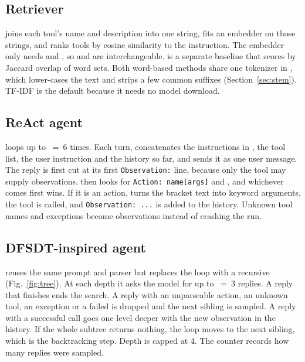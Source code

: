 \documentclass[conference,a4paper]{IEEEtran}
\begin{document}
\subsection{Retriever}
 joins each tool's name and description into one
string, fits an embedder on those strings, and ranks tools by cosine
similarity to the instruction. The embedder only needs  and
, so  and
 are interchangeable.
 is a separate baseline that scores by Jaccard
overlap of word sets. Both word-based methods share one tokenizer in
, which lower-cases the text and strips a few
common suffixes (Section~\ref{sec:stem}). TF-IDF is the default because it
needs no model download.

\subsection{ReAct agent}
 loops up to ~=~6 times. Each turn,
 concatenates the instructions in
, the tool list, the user instruction and the
history so far, and sends it as one user message. The reply is first cut
at its first \texttt{Observation:} line, because only the tool may supply
observations.  then looks for \texttt{Action: name[args]}
and , and whichever comes first wins. If it is an
action,  turns the bracket text into keyword
arguments, the tool is called, and \texttt{Observation: ...} is added to the
history. Unknown tool names and exceptions become 
observations instead of crashing the run.

\subsection{DFSDT-inspired agent}\label{sec:dfsdt}
 reuses the same prompt and parser but replaces the loop
with a recursive  (Fig.~\ref{fig:tree}). At each depth it
asks the model for up to ~=~3 replies. A reply that
finishes ends the search. A reply with an unparseable action, an unknown
tool, an exception or a failed  is dropped and the next
sibling is sampled. A reply with a successful call goes one level deeper
with the new observation in the history. If the whole subtree returns
nothing, the loop moves to the next sibling, which is the backtracking
step. Depth is capped at 4. The counter  records how
many replies were sampled.
\end{document}
